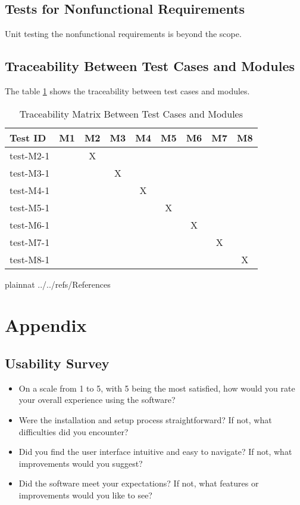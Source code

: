 \documentclass[12pt, titlepage]{article}
\begin{document}
\subsection{Tests for Nonfunctional Requirements}

Unit testing the nonfunctional requirements is beyond the scope. 

\subsection{Traceability Between Test Cases and Modules}
The table \ref{Table:Unit} shows the traceability between test cases and modules.


\begin{table}[h!]\label{Table:Unit}
  \centering
  \begin{tabular}{|l|c|c|c|c|c|c|c|c|}
  \hline
  \textbf{Test ID} & \textbf{M1} & \textbf{M2} & \textbf{M3} & \textbf{M4} & \textbf{M5} & \textbf{M6} & \textbf{M7} & \textbf{M8} \\
  \hline
  test-M2-1 &   & X &   &   &   &   &   &   \\
  test-M3-1 &   &   & X &   &   &   &   &   \\
  test-M4-1 &   &   &   & X &   &   &   &   \\
  test-M5-1 &   &   &   &   & X &   &   &   \\
  test-M6-1 &   &   &   &   &   & X &   &   \\
  test-M7-1 &   &   &   &   &   &  &  X &   \\
  test-M8-1 &   &   &   &   &   &   &   & X \\
  \hline
  \end{tabular}
  \caption{Traceability Matrix Between Test Cases and Modules}
  \end{table}

   {plainnat}
   {../../refs/References}

\newpage
\section{Appendix}


\subsection{Usability Survey}\label{US}
\begin{itemize}
\item On a scale from 1 to 5, with 5 being the most satisfied, how would you rate your overall experience using the software?
\item Were the installation and setup process straightforward? If not, what difficulties did you encounter?
\item Did you find the user interface intuitive and easy to navigate? If not, what improvements would you suggest?
\item Did the software meet your expectations? If not, what features or improvements would you like to see?
\end{itemize}
\end{document}
